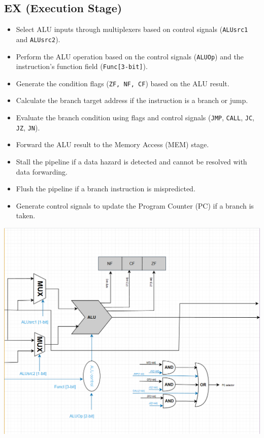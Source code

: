 \documentclass{report}
\begin{document}
\subsection*{EX (Execution Stage)}
\begin{minipage}{0.6\textwidth}
\begin{itemize}
    \item Select ALU inputs through multiplexers based on control signals (\texttt{ALUsrc1} and \texttt{ALUsrc2}).
    \item Perform the ALU operation based on the control signals (\texttt{ALUOp}) and the instruction’s function field (\texttt{Func[3-bit]}).
    \item Generate the condition flags (\texttt{ZF, NF, CF}) based on the ALU result.
    \item Calculate the branch target address if the instruction is a branch or jump.
    \item Evaluate the branch condition using flags and control signals (\texttt{JMP}, \texttt{CALL}, \texttt{JC}, \texttt{JZ}, \texttt{JN}).
    \item Forward the ALU result to the Memory Access (MEM) stage.
    \item Stall the pipeline if a data hazard is detected and cannot be resolved with data forwarding.
    \item Flush the pipeline if a branch instruction is mispredicted.
    \item Generate control signals to update the Program Counter (PC) if a branch is taken.
\end{itemize}
\end{minipage}
\begin{minipage}{0.35\textwidth}
\begin{center}
    \includegraphics[width=\textwidth]{./assets/EX.png}
\end{center}
\end{minipage}
\end{document}
